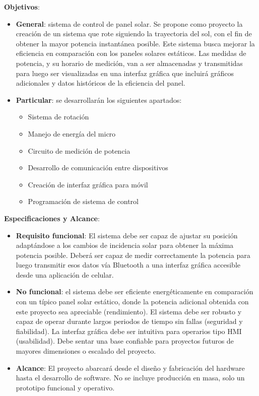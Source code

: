 \documentclass[a4paper,12pt]{article}
\begin{document}
\textbf{Objetivos}: 
\begin{itemize}
    \item \textbf{General}: sistema de control de panel solar. Se propone como proyecto la creación de un sistema que rote siguiendo la trayectoria del sol, con el fin de obtener la mayor potencia instantánea posible. Este sistema busca mejorar la eficiencia en comparación con los paneles solares estáticos. Las medidas de potencia, y su horario de medición, van a ser almacenadas y transmitidas para luego ser visualizadas en una interfaz gráfica que incluirá gráficos adicionales y datos históricos de la eficiencia del panel.
    \item \textbf{Particular}: se desarrollarán los siguientes apartados:
    \begin{itemize}
        \item Sistema de rotación
        \item Manejo de energía del micro
        \item Circuito de medición de potencia
        \item Desarrollo de comunicación entre dispositivos
        \item Creación de interfaz gráfica para móvil
        \item Programación de sistema de control
    \end{itemize}
\end{itemize}

\textbf{Especificaciones y Alcance}:
\begin{itemize}
    \item \textbf{Requisito funcional}: El sistema debe ser capaz de ajustar su posición adaptándose a los cambios de incidencia solar para obtener la máxima potencia posible. Deberá ser capaz de medir correctamente la potencia para luego transmitir esos datos vía Bluetooth a una interfaz gráfica accesible desde una aplicación de celular.
    \item \textbf{No funcional}: el sistema debe ser eficiente energéticamente en comparación con un típico panel solar estático, donde la potencia adicional obtenida con este proyecto sea apreciable (rendimiento). El sistema debe ser robusto y capaz de operar durante largos periodos de tiempo sin fallas (seguridad y fiabilidad). La interfaz gráfica debe ser intuitiva para operarios tipo HMI (usabilidad). Debe sentar una base confiable para proyectos futuros de mayores dimensiones o escalado del proyecto.
    \item \textbf{Alcance}: El proyecto abarcará desde el diseño y fabricación del hardware hasta el desarrollo de software. No se incluye producción en masa, solo un prototipo funcional y operativo.
\end{itemize}
\end{document}
